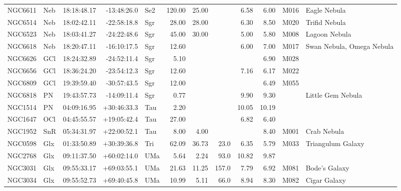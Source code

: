 \documentclass[11pt]{article}
\begin{document}
\begin{longtable}{llrrlrrrrrrl}
  NGC6611 & Neb     & 18:18:48.17 & -13:48:26.0 & Se2   & 120.00 & 25.00  &       & 6.58  & 6.00  & M016    & Eagle Nebula                   \\
  NGC6514 & Neb     & 18:02:42.11 & -22:58:18.8 & Sgr   & 28.00  & 28.00  &       & 6.30  & 8.50  & M020    & Trifid Nebula                  \\
  NGC6523 & Neb     & 18:03:41.27 & -24:22:48.6 & Sgr   & 45.00  & 30.00  &       & 5.00  & 5.80  & M008    & Lagoon Nebula                  \\
  NGC6618 & Neb     & 18:20:47.11 & -16:10:17.5 & Sgr   & 12.60  &        &       & 6.00  & 7.00  & M017    & Swan Nebula, Omega Nebula      \\
  NGC6626 & GCl     & 18:24:32.89 & -24:52:11.4 & Sgr   & 5.10   &        &       &       & 6.90  & M028    &                                \\
  NGC6656 & GCl     & 18:36:24.20 & -23:54:12.3 & Sgr   & 12.60  &        &       & 7.16  & 6.17  & M022    &                                \\
  NGC6809 & GCl     & 19:39:59.40 & -30:57:43.5 & Sgr   & 12.00  &        &       &       & 6.49  & M055    &                                \\
  NGC6818 & PN      & 19:43:57.73 & -14:09:11.4 & Sgr   & 0.77   &        &       & 9.90  & 9.30  &         & Little Gem Nebula              \\
  NGC1514 & PN      & 04:09:16.95 & +30:46:33.3 & Tau   & 2.20   &        &       & 10.05 & 10.19 &         &                                \\
  NGC1647 & OCl     & 04:45:55.57 & +19:05:42.4 & Tau   & 27.00  &        &       & 6.82  & 6.40  &         &                                \\
  NGC1952 & SnR     & 05:34:31.97 & +22:00:52.1 & Tau   & 8.00   & 4.00   &       &       & 8.40  & M001    & Crab Nebula                    \\
  NGC0598 & Glx     & 01:33:50.89 & +30:39:36.8 & Tri   & 62.09  & 36.73  & 23.0  & 6.35  & 5.79  & M033    & Triangulum Galaxy              \\
  NGC2768 & Glx     & 09:11:37.50 & +60:02:14.0 & UMa   & 5.64   & 2.24   & 93.0  & 10.82 & 9.87  &         &                                \\
  NGC3031 & Glx     & 09:55:33.17 & +69:03:55.1 & UMa   & 21.63  & 11.25  & 157.0 & 7.79  & 6.92  & M081    & Bode's Galaxy                  \\
  NGC3034 & Glx     & 09:55:52.73 & +69:40:45.8 & UMa   & 10.99  & 5.11   & 66.0  & 8.94  & 8.30  & M082    & Cigar Galaxy                   \\

\end{longtable}
\end{document}
